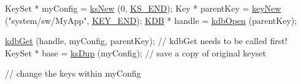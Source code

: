 \begin{DoxyCodeInclude}
KeySet * myConfig = \hyperlink{group__keyset_ga671e1aaee3ae9dc13b4834a4ddbd2c3c}{ksNew} (0, \hyperlink{kdbenum_8c_a7a28fce3773b2c873c94ac80b8b4cd54}{KS\_END});
Key * parentKey = \hyperlink{group__key_gad23c65b44bf48d773759e1f9a4d43b89}{keyNew} (\textcolor{stringliteral}{"system/sw/MyApp"}, \hyperlink{group__key_gga91fb3178848bd682000958089abbaf40aa8adb6fcb92dec58fb19410eacfdd403}{KEY\_END});
\hyperlink{classkdb_1_1KDB_a7e0637995ce9f294cdbc6f167df6db40}{KDB} * handle = \hyperlink{group__kdb_ga6808defe5870f328dd17910aacbdc6ca}{kdbOpen} (parentKey);

\hyperlink{group__kdb_ga28e385fd9cb7ccfe0b2f1ed2f62453a1}{kdbGet} (handle, myConfig, parentKey); \textcolor{comment}{// kdbGet needs to be called first!}
KeySet * base = \hyperlink{group__keyset_gac59e4b328245463f1451f68d5106151c}{ksDup} (myConfig);     \textcolor{comment}{// save a copy of original keyset}

\textcolor{comment}{// change the keys within myConfig}


\end{DoxyCodeInclude}

